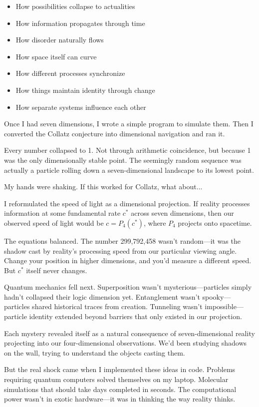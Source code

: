 \begin{itemize}
\item How possibilities collapse to actualities
\item How information propagates through time
\item How disorder naturally flows
\item How space itself can curve
\item How different processes synchronize
\item How things maintain identity through change
\item How separate systems influence each other
\end{itemize}

Once I had seven dimensions, I wrote a simple program to simulate them. Then I converted the Collatz conjecture into dimensional navigation and ran it.

Every number collapsed to 1. Not through arithmetic coincidence, but because 1 was the only dimensionally stable point. The seemingly random sequence was actually a particle rolling down a seven-dimensional landscape to its lowest point.

My hands were shaking. If this worked for Collatz, what about...

I reformulated the speed of light as a dimensional projection. If reality processes information at some fundamental rate $c^*$ across seven dimensions, then our observed speed of light would be $c = P_4(c^*)$, where $P_4$ projects onto spacetime.

The equations balanced. The number 299,792,458 wasn't random—it was the shadow cast by reality's processing speed from our particular viewing angle. Change your position in higher dimensions, and you'd measure a different speed. But $c^*$ itself never changes.

Quantum mechanics fell next. Superposition wasn't mysterious—particles simply hadn't collapsed their logic dimension yet. Entanglement wasn't spooky—particles shared historical traces from creation. Tunneling wasn't impossible—particle identity extended beyond barriers that only existed in our projection.

Each mystery revealed itself as a natural consequence of seven-dimensional reality projecting into our four-dimensional observations. We'd been studying shadows on the wall, trying to understand the objects casting them.

But the real shock came when I implemented these ideas in code. Problems requiring quantum computers solved themselves on my laptop. Molecular simulations that should take days completed in seconds. The computational power wasn't in exotic hardware—it was in thinking the way reality thinks.

